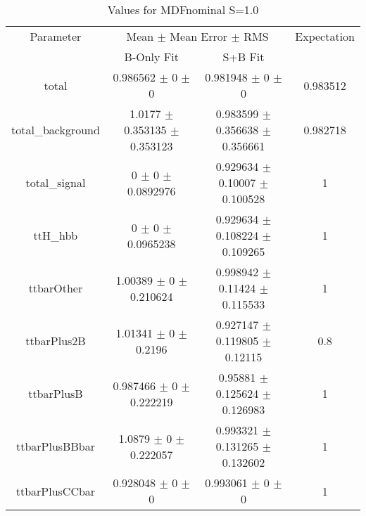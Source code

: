 \begin{table}
\centering
\caption{Values for MDFnominal S=1.0}
\begin{tabular}{cccc}
\toprule
Parameter & \multicolumn{2}{c}{Mean $\pm$ Mean Error $\pm$ RMS} & Expectation\\
 & B-Only Fit & S+B Fit & \\
\midrule
total & \num{0.986562} $\pm$ \num{0} $\pm$ \num{0} & \num{0.981948} $\pm$ \num{0} $\pm$ \num{0} & \num{0.983512}\\
total\_background & \num{1.0177} $\pm$ \num{0.353135} $\pm$ \num{0.353123} & \num{0.983599} $\pm$ \num{0.356638} $\pm$ \num{0.356661} & \num{0.982718}\\
total\_signal & \num{0} $\pm$ \num{0} $\pm$ \num{0.0892976} & \num{0.929634} $\pm$ \num{0.10007} $\pm$ \num{0.100528} & \num{1}\\
ttH\_hbb & \num{0} $\pm$ \num{0} $\pm$ \num{0.0965238} & \num{0.929634} $\pm$ \num{0.108224} $\pm$ \num{0.109265} & \num{1}\\
ttbarOther & \num{1.00389} $\pm$ \num{0} $\pm$ \num{0.210624} & \num{0.998942} $\pm$ \num{0.11424} $\pm$ \num{0.115533} & \num{1}\\
ttbarPlus2B & \num{1.01341} $\pm$ \num{0} $\pm$ \num{0.2196} & \num{0.927147} $\pm$ \num{0.119805} $\pm$ \num{0.12115} & \num{0.8}\\
ttbarPlusB & \num{0.987466} $\pm$ \num{0} $\pm$ \num{0.222219} & \num{0.95881} $\pm$ \num{0.125624} $\pm$ \num{0.126983} & \num{1}\\
ttbarPlusBBbar & \num{1.0879} $\pm$ \num{0} $\pm$ \num{0.222057} & \num{0.993321} $\pm$ \num{0.131265} $\pm$ \num{0.132602} & \num{1}\\
ttbarPlusCCbar & \num{0.928048} $\pm$ \num{0} $\pm$ \num{0} & \num{0.993061} $\pm$ \num{0} $\pm$ \num{0} & \num{1}\\
\bottomrule
\end{tabular}
\end{table}